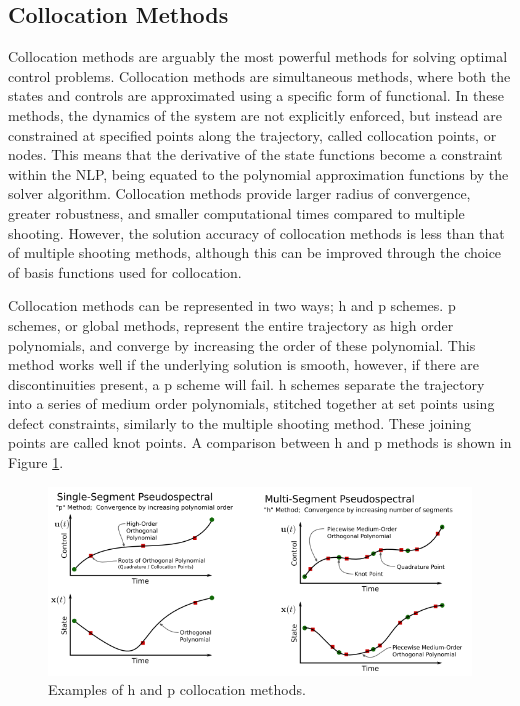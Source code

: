 \subsection{Collocation Methods}

Collocation methods are arguably the most powerful methods for solving optimal control problems\cite{Rao2009}. Collocation methods are simultaneous methods, where both the states and controls are approximated using a specific form of functional\cite{Kelly2015,Rao2009}. In these methods, the dynamics of the system are not explicitly enforced, but instead are constrained at specified points along the trajectory, called collocation points, or nodes\cite{Kelly2015}. This means that the derivative of the state functions become a constraint within the NLP, being equated to the polynomial approximation functions by the solver algorithm. 
Collocation methods provide larger radius of convergence, greater robustness, and smaller computational times compared to multiple shooting\cite{Fasano2013}. However, the solution accuracy of collocation methods is less than that of multiple shooting methods\cite{Fasano2013}, although this can be improved through the choice of basis functions used for collocation\cite{Rao2009}.

Collocation methods can be represented in two ways; \textsf{h} and \textsf{p} schemes\cite{Kelly2015}. \textsf{p} schemes, or global methods, represent the entire trajectory as high order polynomials, and converge by increasing the order of these polynomial\cite{Kelly2015}. This method works well if the underlying solution is smooth, however, if there are discontinuities present, a \textsf{p} scheme will fail\cite{Kelly2015}. \textsf{h} schemes separate the trajectory into a series of medium order polynomials, stitched together at set points using defect constraints, similarly to the multiple shooting method\cite{Kelly2015,Rao2009,Ross2004}. These joining points are called knot points\cite{Kelly2015,Ross2004}. A comparison between \textsf{h} and \textsf{p} methods is shown in Figure \ref{fig:HPExamples}.

\begin{figure}[ht]
	\centering
	\includegraphics[width=0.9\linewidth]{figures/2_literature-review/HPExamples}
	\caption{Examples of \textsf{h} and \textsf{p} collocation methods\cite{Kelly2015}.}
	\label{fig:HPExamples}
\end{figure}


